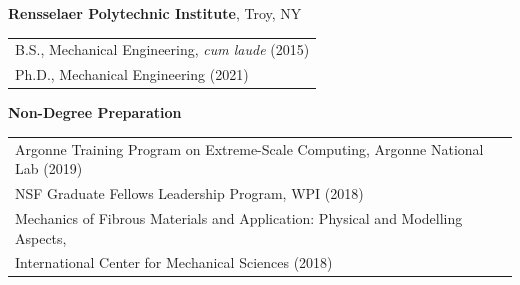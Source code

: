 \noindent\textbf{Rensselaer Polytechnic Institute}, Troy, NY \hfill {}

\hspace{.3 in}
\begin{tabular}{l}
B.S., Mechanical Engineering, \emph{cum laude} (2015)\\
Ph.D., Mechanical Engineering (2021) \vspace{.1 in}\\
\end{tabular}


\noindent\textbf{Non-Degree Preparation} \hfill {}

\hspace{.3 in}
\begin{tabular}{l}
Argonne Training Program on Extreme-Scale Computing, Argonne National Lab (2019)\\
NSF Graduate Fellows Leadership Program, WPI (2018)\\
Mechanics of Fibrous Materials and Application: Physical and Modelling Aspects, \\
\hspace{.35 in} International Center for Mechanical Sciences (2018)
\end{tabular}

